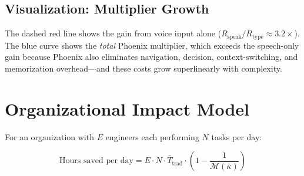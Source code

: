 \documentclass[11pt, a4paper]{article}
\begin{document}
\subsection{Visualization: Multiplier Growth}

\begin{center}
\end{center}

The dashed red line shows the gain from voice input alone ($R_{\text{speak}} / R_{\text{type}} \approx 3.2\times$). The blue curve shows the \emph{total} Phoenix multiplier, which exceeds the speech-only gain because Phoenix also eliminates navigation, decision, context-switching, and memorization overhead---and these costs grow superlinearly with complexity.

\section{Organizational Impact Model}

For an organization with $E$ engineers each performing $N$ tasks per day:

\begin{equation}
  \text{Hours saved per day} = E \cdot N \cdot \bar{T}_{\text{trad}} \cdot \left(1 - \frac{1}{\mathcal{M}(\bar{\kappa})}\right)
\end{equation}
\end{document}
